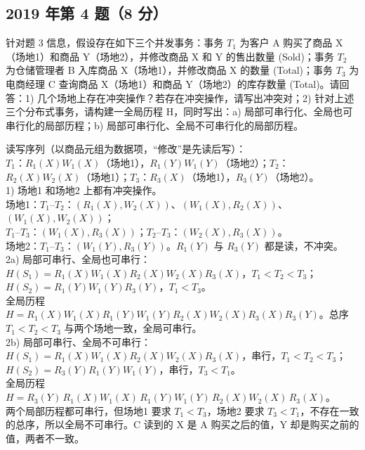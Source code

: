 \documentclass[10pt,a4paper]{article}
\newenvironment{keep}{\par\noindent\begin{minipage}{\linewidth}\setlength{\parskip}{3pt plus 1pt}}{\end{minipage}\par\vspace{2pt}}
\begin{document}
\subsection{2019 年第 4 题（8 分）}
\begin{keep}
\begin{prob}[原题]
针对题 3 信息，假设存在如下三个并发事务：事务 $T_1$ 为客户 A 购买了商品 X（场地1）和商品 Y（场地2），并修改商品 X 和 Y 的售出数量 (Sold)；事务 $T_2$ 为仓储管理者 B 入库商品 X（场地1），并修改商品 X 的数量 (Total)；事务 $T_3$ 为电商经理 C 查询商品 X（场地1）和商品 Y（场地2）的库存数量 (Total)。请回答：1) 几个场地上存在冲突操作？若存在冲突操作，请写出冲突对；2) 针对上述三个分布式事务，请构建一全局历程 H，同时写出：a) 局部可串行化、全局也可串行化的局部历程；b) 局部可串行化、全局不可串行化的局部历程。
\end{prob}
\begin{ans}[2019 年第 4 题]
读写序列（以商品元组为数据项，“修改”是先读后写）：\\
\hspace*{1em}$T_1$：$R_1(X)W_1(X)$（场地1），$R_1(Y)W_1(Y)$（场地2）；\quad $T_2$：$R_2(X)W_2(X)$（场地1）；\quad $T_3$：$R_3(X)$（场地1），$R_3(Y)$（场地2）。\\
1) 场地1 和场地2 上都有冲突操作。\\
\hspace*{1em}场地1：\quad $T_1$–$T_2$：$(R_1(X),W_2(X))$、$(W_1(X),R_2(X))$、$(W_1(X),W_2(X))$；\\
\hspace*{4.4em}$T_1$–$T_3$：$(W_1(X),R_3(X))$；\quad $T_2$–$T_3$：$(W_2(X),R_3(X))$。\\
\hspace*{1em}场地2：\quad $T_1$–$T_3$：$(W_1(Y),R_3(Y))$。$R_1(Y)$ 与 $R_3(Y)$ 都是读，不冲突。\\[2pt]
2a) 局部可串行、全局也可串行：\\
\hspace*{1em}$H(S_1)=R_1(X)W_1(X)R_2(X)W_2(X)R_3(X)$，$T_1<T_2<T_3$；\quad
$H(S_2)=R_1(Y)W_1(Y)R_3(Y)$，$T_1<T_3$。\\
\hspace*{1em}全局历程 $H=R_1(X)W_1(X)R_1(Y)W_1(Y)R_2(X)W_2(X)R_3(X)R_3(Y)$。总序 $T_1<T_2<T_3$ 与两个场地一致，全局可串行。\\[2pt]
2b) 局部可串行、全局不可串行：\\
\hspace*{1em}$H(S_1)=R_1(X)W_1(X)R_2(X)W_2(X)R_3(X)$，串行，$T_1<T_2<T_3$；\quad
$H(S_2)=R_3(Y)R_1(Y)W_1(Y)$，串行，$T_3<T_1$。\\
\hspace*{1em}全局历程 $H=R_3(Y)\,R_1(X)W_1(X)\,R_1(Y)W_1(Y)\,R_2(X)W_2(X)\,R_3(X)$。\\
\hspace*{1em}两个局部历程都可串行，但场地1 要求 $T_1<T_3$，场地2 要求 $T_3<T_1$，不存在一致的总序，所以全局不可串行。C 读到的 X 是 A 购买之后的值，Y 却是购买之前的值，两者不一致。
\end{ans}
\end{keep}
\end{document}
